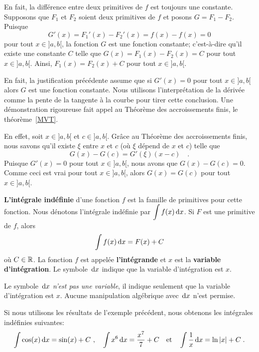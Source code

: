 {En fait, la différence entre deux primitives de $f$ est toujours une
constante.  Supposons que $F_1$ et $F_2$ soient deux primitives de $f$
et posons $G = F_1 - F_2$.  Puisque
\[
G'(x) = F_1'(x) - F_2'(x) = f(x) - f(x) = 0
\]
pour tout $x \in]a,b[$, la fonction $G$ est une fonction constante;
c'est-à-dire qu'il existe une constante $C$ telle que
$G(x) = F_1(x) - F_2(x) = C$ pour tout $x\in ]a,b[$.
Ainsi, $F_1(x) = F_2(x) + C$ pour tout $x \in ]a,b[$.

\begin{rmk}[\theory]
En fait, la justification précédente assume que si $G'(x)=0$ pour tout
$x\in]a,b[$ alors $G$ est une fonction constante.  Nous utilisons
l'interprétation de la dérivée comme la pente de la tangente à la
courbe pour tirer cette conclusion.  Une démonstration rigoureuse fait
appel au Théorème des accroissements finis, le théorème~\ref{MVT}.

En effet, soit $x \in ]a,b[$ et $c \in ]a,b[$.  Grâce au Théorème des
accroissements finis, nous savons qu'il existe $\xi$ entre $x$ et $c$ (où
$\xi$ dépend de $x$ et $c$) telle que
\[
G(x) - G(c) = G'(\xi)(x-c)  \quad .
\]
Puisque $G'(x) = 0$ pour tout $x \in]a,b[$, nous avons que
$G(x) - G(c) = 0$.  Comme ceci est vrai pour tout $x\in ]a,b[$, alors
$G(x) = G(c)$ pour tout $x\in ]a,b[$.
\end{rmk}

\begin{defn}
{\bfseries L'intégrale indéfinie} d'une fonction $f$ est la famille de
primitives pour cette fonction.  Nous dénotons l'intégrale indéfinie par
$\displaystyle \int f(x) \,\mathrm{d}x$.  Si $F$ est une primitive de
$f$, alors
\[ 
\int f(x)  \,\mathrm{d}x = F(x) + C
\]
où $C \in \mathbb{R}$.  La fonction $f$ est appelée {\bfseries l'intégrande}
et $x$ est la {\bfseries variable d'intégration}.  Le symbole $\,\mathrm{d}x$
indique que la variable d'intégration est $x$.
\end{defn}

Le symbole $\,\mathrm{d}x$ {\em n'est pas une variable}, il indique
seulement que la variable d'intégration est $x$.  Aucune
manipulation algébrique avec $\,\mathrm{d}x$ n'est permise.

\begin{egg}
Si nous utilisons les résultats de l'exemple précédent, nous obtenons les
intégrales indéfinies suivantes:
\[
\int \cos(x)  \,\mathrm{d}x = \sin(x) + C \ , \quad
\int x^6  \,\mathrm{d}x = \frac{x^7}{7} + C \quad \text{et} \quad
\int \frac{1}{x}  \,\mathrm{d}x = \ln|x| + C \; .
\]
\end{egg}

}
